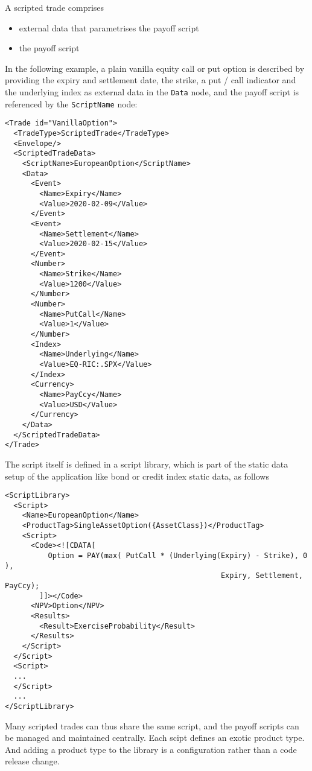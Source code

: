 A scripted trade comprises

\begin{itemize}
\item external data that parametrises the payoff script
\item the payoff script
\end{itemize}

In the following example, a plain vanilla equity call or put option is described by providing the expiry and settlement
date, the strike, a put / call indicator and the underlying index as external data in the \verb+Data+ node, and the
payoff script is referenced by the \verb+ScriptName+ node:

\begin{verbatim}
<Trade id="VanillaOption">
  <TradeType>ScriptedTrade</TradeType>
  <Envelope/>
  <ScriptedTradeData>
    <ScriptName>EuropeanOption</ScriptName>
    <Data>
      <Event>
        <Name>Expiry</Name>
        <Value>2020-02-09</Value>
      </Event>
      <Event>
        <Name>Settlement</Name>
        <Value>2020-02-15</Value>
      </Event>
      <Number>
        <Name>Strike</Name>
        <Value>1200</Value>
      </Number>
      <Number>
        <Name>PutCall</Name>
        <Value>1</Value>
      </Number>
      <Index>
        <Name>Underlying</Name>
        <Value>EQ-RIC:.SPX</Value>
      </Index>
      <Currency>
        <Name>PayCcy</Name>
        <Value>USD</Value>
      </Currency>
    </Data>
  </ScriptedTradeData>
</Trade>
\end{verbatim}

The script itself is defined in a script library, which is part of
the static data setup of the application like bond or credit index static data, as follows

\begin{verbatim}
<ScriptLibrary>
  <Script>
    <Name>EuropeanOption</Name>
    <ProductTag>SingleAssetOption({AssetClass})</ProductTag>
    <Script>
      <Code><![CDATA[
          Option = PAY(max( PutCall * (Underlying(Expiry) - Strike), 0 ),
                                                  Expiry, Settlement, PayCcy);
        ]]></Code>
      <NPV>Option</NPV>
      <Results>
        <Result>ExerciseProbability</Result>
      </Results>
    </Script>
  </Script>
  <Script>
  ...
  </Script>
  ...
</ScriptLibrary>
\end{verbatim}

Many scripted trades can thus share the same script, and the payoff scripts can be managed and maintained
centrally. Each scipt defines an exotic product type. And adding a product type to the library is a configuration rather
than a code release change.

